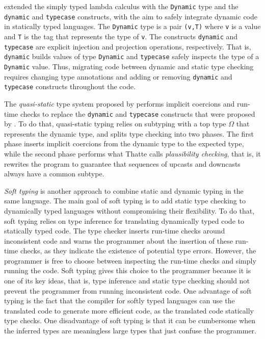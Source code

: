 \documentclass[preprint]{sig-alternate}
\begin{document}
\citet{abadi1989dts} extended the simply typed lambda calculus with the
\texttt{Dynamic} type and the \texttt{dynamic} and \texttt{typecase}
constructs, with the aim to safely integrate dynamic code in
statically typed languages.
The \texttt{Dynamic} type is a pair \texttt{(v,T)} where \texttt{v} is a
value and \texttt{T} is the tag that represents the type of \texttt{v}.
The constructs \texttt{dynamic} and \texttt{typecase} are explicit
injection and projection operations, respectively.
That is, \texttt{dynamic} builds values of type \texttt{Dynamic} and
\texttt{typecase} safely inspects the type of a \texttt{Dynamic} value.
Thus, migrating code between dynamic and static type checking requires
changing type annotations and adding or removing \texttt{dynamic} and
\texttt{typecase} constructs throughout the code.

The \textit{quasi-static} type system proposed by \citet{thatte1990qst}
performs implicit coercions and run-time checks to replace the
\texttt{dynamic} and \texttt{typecase} constructs that were proposed by
\citet{abadi1989dts}.
To do that, quasi-static typing relies on subtyping with a top type
$\Omega$ that represents the dynamic type, and splits type checking
into two phases.
The first phase inserts implicit coercions from the dynamic type to
the expected type, while the second phase performs what Thatte calls
\textit{plausibility checking}, that is, it rewrites the program to
guarantee that sequences of upcasts and downcasts always have a
common subtype.

\textit{Soft typing} \citep{cartwright1991soft} is another approach
to combine static and dynamic typing in the same language.
The main goal of soft typing is to add static type checking to
dynamically typed languages without compromising their flexibility.
To do that, soft typing relies on type inference for
translating dynamically typed code to statically typed code.
The type checker inserts run-time checks around inconsistent code and
warns the programmer about the insertion of these run-time checks,
as they indicate the existence of potential type errors.
However, the programmer is free to choose between inspecting the
run-time checks and simply running the code.
Soft typing gives this choice to the programmer because it is one of
its key ideas, that is, type inference and static type checking should
not prevent the programmer from running inconsistent code.
One advantage of soft typing is the fact that the compiler for
softly typed languages can use the translated code to generate
more efficient code, as the translated code statically type checks.
One disadvantage of soft typing is that it can be cumbersome when
the inferred types are meaningless large types that just confuse the
programmer.
\end{document}

